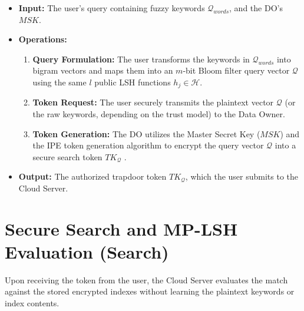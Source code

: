 \begin{itemize}
    \item \textbf{Input:} The user's query containing fuzzy keywords $\mathcal{Q}_{words}$, and the DO's $MSK$.
    \item \textbf{Operations:}
    \begin{enumerate}
        \item \textbf{Query Formulation:} The user transforms the keywords in $\mathcal{Q}_{words}$ into bigram vectors and maps them into an $m$-bit Bloom filter query vector $\mathcal{Q}$ using the same $l$ public LSH functions $h_j \in \mathcal{H}$.%
        \item \textbf{Token Request:} The user securely transmits the plaintext vector $\mathcal{Q}$ (or the raw keywords, depending on the trust model) to the Data Owner.
        \item \textbf{Token Generation:} The DO utilizes the Master Secret Key ($MSK$) and the IPE token generation algorithm to encrypt the query vector $\mathcal{Q}$ into a secure search token $TK_{\mathcal{Q}}$ \cite{shen2009predicate}.
    \end{enumerate}
    \item \textbf{Output:} The authorized trapdoor token $TK_{\mathcal{Q}}$, which the user submits to the Cloud Server.
\end{itemize}

\section{Secure Search and MP-LSH Evaluation (Search)}

Upon receiving the token from the user, the Cloud Server evaluates the match against the stored encrypted indexes without learning the plaintext keywords or index contents.

